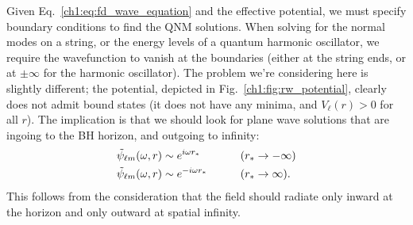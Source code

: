Given Eq.~\ref{ch1:eq:fd_wave_equation} and the effective potential, we must specify boundary conditions to find the QNM solutions.
When solving for the normal modes on a string, or the energy levels of a quantum harmonic oscillator, we require the wavefunction to vanish at the boundaries (either at the string ends, or at $\pm \infty$ for the harmonic oscillator).
The problem we're considering here is slightly different; the potential, depicted in Fig.~\ref{ch1:fig:rw_potential}, clearly does not admit bound states (it does not have any minima, and $V_\ell(r) > 0$ for all $r$).
The implication is that we should look for plane wave solutions that are ingoing to the BH horizon, and outgoing to infinity:
\begin{alignat}{2}
    &\tilde{\psi}_{\ell m}(\omega, r) \sim e^{i \omega r_*} \qquad &&\qty(r_* \rightarrow -\infty) \nonumber \\
    &\tilde{\psi}_{\ell m}(\omega, r) \sim e^{- i \omega r_*} \qquad &&\qty(r_* \rightarrow \infty).
\end{alignat}
This follows from the consideration that the field should radiate only inward at the horizon and only outward at spatial infinity.

